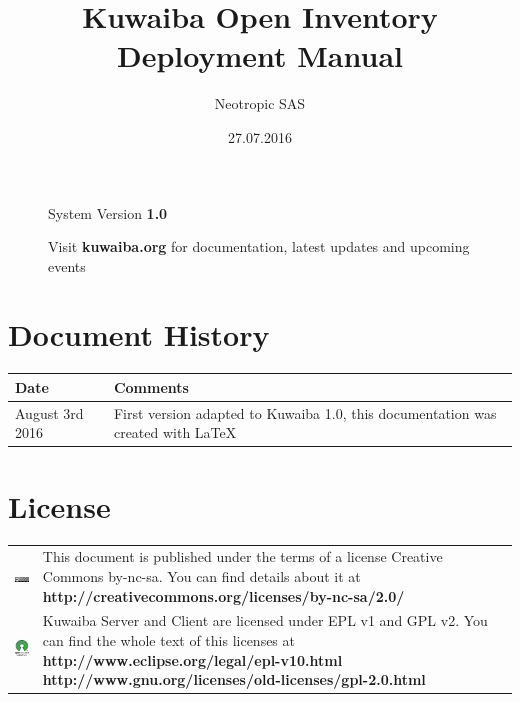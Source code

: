 \documentclass[a4paper]{article}
\title{Kuwaiba Open Inventory Deployment Manual}
\author{Neotropic SAS}
\date{27.07.2016}
\begin{document}
	\maketitle
	
	\begin{figure}[b]
		\centering System Version \textbf{1.0}
			
		Visit \textbf{kuwaiba.org} for documentation, latest updates and upcoming events
	\end{figure}

	\newpage
	
	\tableofcontents

	\newpage
	\section{Document History}
		\begin{table}[h!]
			\centering
			\begin{tabular}{l||p{10cm}} %
				\toprule
				\textbf{Date} & \textbf{Comments}  \\
				\midrule
				August 3rd 2016 & First version adapted to Kuwaiba 1.0, this documentation was created with LaTeX\\
				\bottomrule
			\end{tabular}	
				
		\end{table}
	\newpage
	\section{License}
		\begin{table}[ht]
			\centering
			\begin{tabular}{cp{10cm}}
				
				\includegraphics[]{img/cc_license_logo.jpg} & This document is published under the terms of a license Creative Commons by-nc-sa. You can find details about it at\linebreak
				\textbf{http://creativecommons.org/licenses/by-nc-sa/2.0/ } \\

				\includegraphics[width=2cm]{img/osi_logo.jpg} & Kuwaiba Server and Client are licensed under EPL v1 and GPL v2. You can find the whole text of this licenses at \linebreak
				\textbf{http://www.eclipse.org/legal/epl-v10.html} \linebreak
				\textbf{http://www.gnu.org/licenses/old-licenses/gpl-2.0.html} \\
			\end{tabular}
		\end{table}
\end{document}
